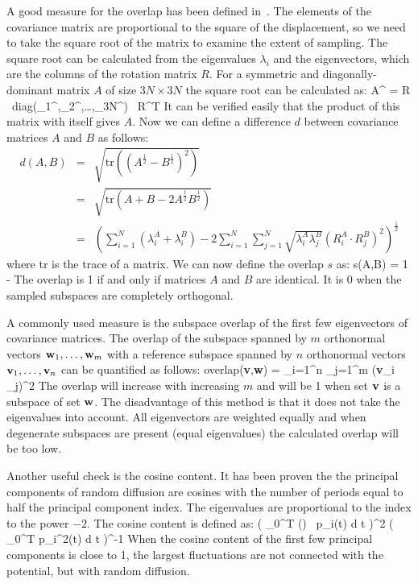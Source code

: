 {A good measure for the overlap has been defined in~\cite{Hess2002b}.
The elements of the covariance matrix are proportional to the square
of the displacement, so we need to take the square root of the matrix
to examine the extent of sampling. The square root can be
calculated from the eigenvalues $\lambda_i$ and the eigenvectors,
which are the columns of the rotation matrix $R$.
For a symmetric and diagonally-dominant matrix $A$ of size $3N \times 3N$
the square root can be calculated as:
\beq
A^ = 
R \, \mbox{diag}(\lambda_1^,\lambda_2^,\ldots,\lambda_{3N}^) \, R^T
\eeq
It can be verified easily that the product of this matrix with itself gives
$A$.
Now we can define a difference $d$ between covariance matrices $A$ and $B$
as follows:
\begin{eqnarray}
d(A,B) & = & \sqrt{\mbox{tr}\left(\left(A^\frac{1}{2} - B^\frac{1}{2}\right)^2\right)
}
\\ & = &
\sqrt{\mbox{tr}\left(A + B - 2 A^\frac{1}{2} B^\frac{1}{2}\right)}
\\ & = &
\left( \sum_{i=1}^N \left( \lambda_i^A + \lambda_i^B \right)
- 2 \sum_{i=1}^N \sum_{j=1}^N \sqrt{\lambda_i^A \lambda_j^B}
\left(R_i^A \cdot R_j^B\right)^2 \right)^\frac{1}{2}
\end{eqnarray}
where tr is the trace of a matrix.
We can now define the overlap $s$ as:
\beq
s(A,B) = 1 - 
\eeq
The overlap is 1 if and only if matrices $A$ and $B$ are identical.
It is 0 when the sampled subspaces are completely orthogonal.

A commonly used measure is the subspace overlap of the first few
eigenvectors of covariance matrices.
The overlap of the subspace spanned by $m$ orthonormal vectors 
${\bf w}_1,\ldots,{\bf w}_m$ with a reference subspace spanned by 
$n$ orthonormal vectors ${\bf v}_1,\ldots,{\bf v}_n$
can be quantified as follows:
\beq
\mbox{overlap}({\bf v},{\bf w}) =
 \sum_{i=1}^n \sum_{j=1}^m ({\bf v}_i _j)^2
\eeq
The overlap will increase with increasing $m$ and will be 1 when
set ${\bf v}$ is a subspace of set ${\bf w}$.
The disadvantage of this method is that it does not take the eigenvalues
into account. All eigenvectors are weighted equally and when
degenerate subspaces are present (equal eigenvalues) the calculated overlap
will be too low.

Another useful check is the cosine content. It has been proven the
the principal components of random diffusion are cosines with the number of
periods equal to half the principal component index\cite{Hess2000,Hess2002b}.
The eigenvalues are proportional to the index to the power $-2$.
The cosine content is defined as:
\beq
{}
\left( \int_0^T \cos\left(\right) \, p_i(t) \mbox{d} t \right)^2
\left( \int_0^T p_i^2(t) \mbox{d} t \right)^{-1}
\eeq
When the cosine content of the first few principal components
is close to 1, the largest fluctuations are not connected with
the potential, but with random diffusion.

}
